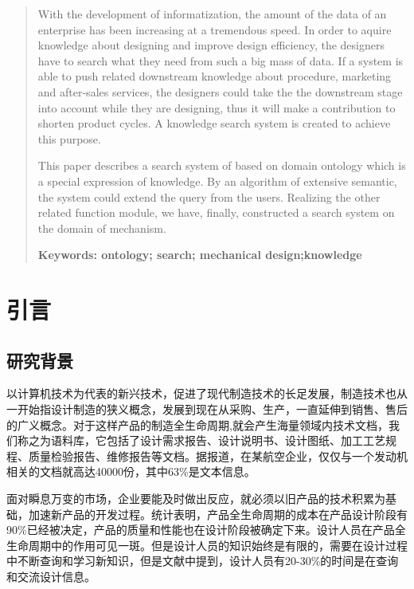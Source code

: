 \documentclass[12pt,a4paper]{article}
\newcommand{\xiaosanhao}{\fontsize{15pt}{\baselineskip}\selectfont}
\begin{document}
\newpage
\renewcommand\abstractname{\xiaosanhao ABSTRACT}
\begin{abstract}
\setlength{\baselineskip}{20pt} %
\Times
With the development of informatization, the amount of the data of an enterprise has been increasing at a tremendous speed. In order to aquire knowledge about designing and improve design efficiency, the designers have to search what they need from such a big mass of data. If a system is able to push related downstream knowledge about procedure, marketing and after-sales services, the designers could take the the downstream stage into account while they are designing, thus it will make a contribution to shorten product cycles. A knowledge search system is created to achieve this purpose.

This paper describes a search system of based on domain ontology which is a special expression of knowledge. By an algorithm of extensive semantic, the system could extend the query from the users. Realizing the other related function module, we have, finally, constructed a search system on the domain of mechanism.  

\bfseries{Keywords: }\mdseries ontology; search; mechanical design;knowledge

\end{abstract}

\newpage



\renewcommand{\contentsname}{目\quad 录}
\tableofcontents



\newpage
\makeatletter %
\setlength{\baselineskip}{20pt} %
\section{引言} 
	\subsection{研究背景}
	以计算机技术为代表的新兴技术，促进了现代制造技术的长足发展，制造技术也从一开始指设计制造的狭义概念，发展到现在从采购、生产，一直延伸到销售、售后的广义概念。对于这样产品的制造全生命周期,就会产生海量领域内技术文档，我们称之为语料库，它包括了设计需求报告、设计说明书、设计图纸、加工工艺规程、质量检验报告、维修报告等文档。据报道，在某航空企业，仅仅与一个发动机相关的文档就高达40000份，其中63\%是文本信息。 \cite{1}
   
	面对瞬息万变的市场，企业要能及时做出反应，就必须以旧产品的技术积累为基础，加速新产品的开发过程。统计表明，产品全生命周期的成本在产品设计阶段有90\%已经被决定，产品的质量和性能也在设计阶段被确定下来。\cite{2}设计人员在产品全生命周期中的作用可见一斑。但是设计人员的知识始终是有限的，需要在设计过程中不断查询和学习新知识，但是文献\cite{1}中提到，设计人员有20-30\%的时间是在查询和交流设计信息。
   
\end{document}

